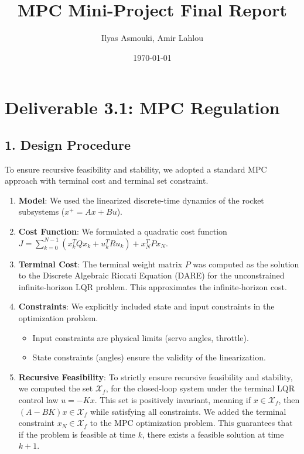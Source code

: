 \documentclass{article}
\title{MPC Mini-Project Final Report}
\author{Ilyas Asmouki, Amir Lahlou}
\date{\today}
\begin{document}
\maketitle

\section*{Deliverable 3.1: MPC Regulation}

\subsection*{1. Design Procedure}

To ensure recursive feasibility and stability, we adopted a standard MPC approach with terminal cost and terminal set constraint.

\begin{enumerate}
    \item  \textbf{Model}: We used the linearized discrete-time dynamics of the rocket subsystems ($x^+ = Ax + Bu$).
    \item  \textbf{Cost Function}: We formulated a quadratic cost function $J = \sum_{k=0}^{N-1} (x_k^T Q x_k + u_k^T R u_k) + x_N^T P x_N$.
    \item  \textbf{Terminal Cost}: The terminal weight matrix $P$ was computed as the solution to the Discrete Algebraic Riccati Equation (DARE) for the unconstrained infinite-horizon LQR problem. This approximates the infinite-horizon cost.
    \item  \textbf{Constraints}: We explicitly included state and input constraints in the optimization problem.
        \begin{itemize}
            \item   Input constraints are physical limits (servo angles, throttle).
            \item   State constraints (angles) ensure the validity of the linearization.
        \end{itemize}
    \item  \textbf{Recursive Feasibility}: To strictly ensure recursive feasibility and stability, we computed the set $\mathcal{X}_f$, for the closed-loop system under the terminal LQR control law $u = -Kx$. This set is positively invariant, meaning if $x \in \mathcal{X}_f$, then $(A-BK)x \in \mathcal{X}_f$ while satisfying all constraints. We added the terminal constraint $x_N \in \mathcal{X}_f$ to the MPC optimization problem. This guarantees that if the problem is feasible at time $k$, there exists a feasible solution at time $k+1$.
\end{enumerate}
\end{document}
